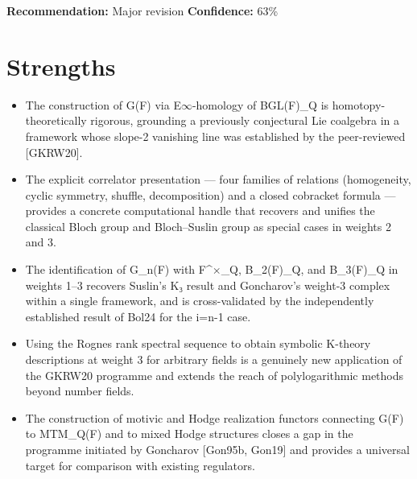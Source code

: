 \documentclass[11pt]{article}
\begin{document}
\textbf{Recommendation:} Major revision \quad \textbf{Confidence:} 63\%\\

\section*{Strengths}
\begin{itemize}[leftmargin=*]
  \item The construction of G(F) via E\ensuremath{\infty}-homology of BGL(F)\_Q is homotopy-theoretically rigorous, grounding a previously conjectural Lie coalgebra in a framework whose slope-2 vanishing line was established by the peer-reviewed [GKRW20].
  \item The explicit correlator presentation --- four families of relations (homogeneity, cyclic symmetry, shuffle, decomposition) and a closed cobracket formula --- provides a concrete computational handle that recovers and unifies the classical Bloch group and Bloch--Suslin group as special cases in weights 2 and 3.
  \item The identification of G\_n(F) with F\^{}\ensuremath{\times}\_Q, B\_2(F)\_Q, and B\_3(F)\_Q in weights 1--3 recovers Suslin's K₃ result and Goncharov's weight-3 complex within a single framework, and is cross-validated by the independently established result of Bol24 for the i=n-1 case.
  \item Using the Rognes rank spectral sequence to obtain symbolic K-theory descriptions at weight 3 for arbitrary fields is a genuinely new application of the GKRW20 programme and extends the reach of polylogarithmic methods beyond number fields.
  \item The construction of motivic and Hodge realization functors connecting G(F) to MTM\_Q(F) and to mixed Hodge structures closes a gap in the programme initiated by Goncharov [Gon95b, Gon19] and provides a universal target for comparison with existing regulators.
\end{itemize}
\end{document}
